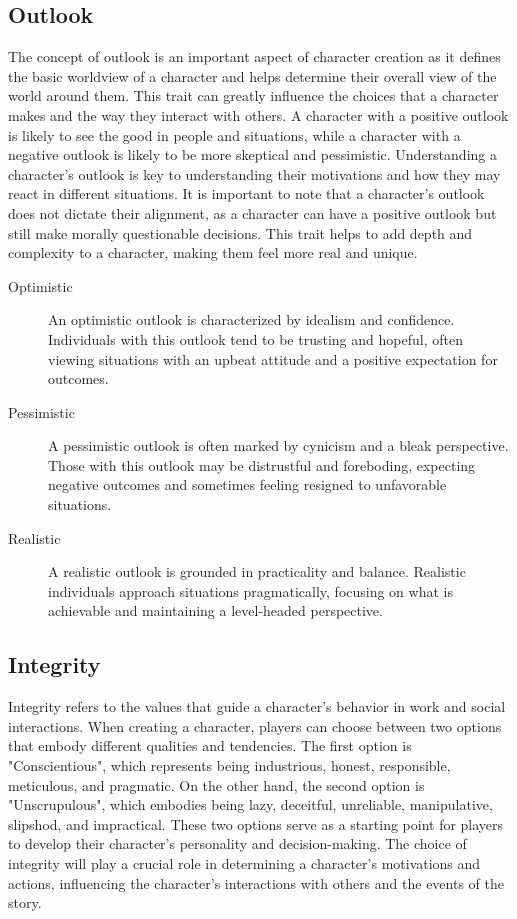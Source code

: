 \documentclass[12pt]{book}
\begin{document}
\subsection{\textbf{Outlook}}

The concept of outlook is an important aspect of character creation as it defines the basic worldview of a character and helps determine their overall view of the world around them. This trait can greatly influence the choices that a character makes and the way they interact with others. A character with a positive outlook is likely to see the good in people and situations, while a character with a negative outlook is likely to be more skeptical and pessimistic. Understanding a character's outlook is key to understanding their motivations and how they may react in different situations. It is important to note that a character's outlook does not dictate their alignment, as a character can have a positive outlook but still make morally questionable decisions. This trait helps to add depth and complexity to a character, making them feel more real and unique.

\begin{description}
    \item[Optimistic] An optimistic outlook is characterized by idealism and confidence. Individuals with this outlook tend to be trusting and hopeful, often viewing situations with an upbeat attitude and a positive expectation for outcomes.
    \item[Pessimistic] A pessimistic outlook is often marked by cynicism and a bleak perspective. Those with this outlook may be distrustful and foreboding, expecting negative outcomes and sometimes feeling resigned to unfavorable situations.
    \item[Realistic] A realistic outlook is grounded in practicality and balance. Realistic individuals approach situations pragmatically, focusing on what is achievable and maintaining a level-headed perspective.
\end{description}

\subsection{\textbf{Integrity}}

Integrity refers to the values that guide a character's behavior in work and social interactions. When creating a character, players can choose between two options that embody different qualities and tendencies. The first option is "Conscientious", which represents being industrious, honest, responsible, meticulous, and pragmatic. On the other hand, the second option is "Unscrupulous", which embodies being lazy, deceitful, unreliable, manipulative, slipshod, and impractical. These two options serve as a starting point for players to develop their character's personality and decision-making. The choice of integrity will play a crucial role in determining a character's motivations and actions, influencing the character's interactions with others and the events of the story.
\end{document}
